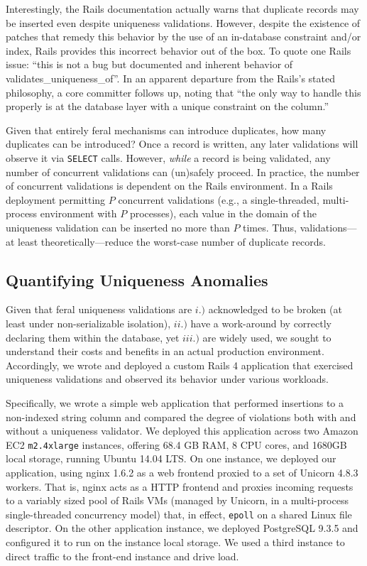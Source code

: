 Interestingly, the Rails documentation actually warns that duplicate
records may be inserted even despite uniqueness validations. However,
despite the existence of patches that remedy this behavior by the use
of an in-database constraint and/or index, Rails provides this
incorrect behavior out of the box. To quote one Rails issue: ``this is
not a bug but documented and inherent behavior of
validates\_uniqueness\_of''. In an apparent departure from the Rails's
stated philosophy, a core committer follows up, noting that ``the only
way to handle this properly is at the database layer with a unique
constraint on the column.''

Given that entirely feral mechanisms can introduce duplicates, how
many duplicates can be introduced? Once a record is written, any later
validations will observe it via \texttt{SELECT} calls. However,
\textit{while} a record is being validated, any number of concurrent
validations can (un)safely proceed. In practice, the number of
concurrent validations is dependent on the Rails environment. In a
Rails deployment permitting $P$ concurrent validations (e.g., a
single-threaded, multi-process environment with $P$ processes), each
value in the domain of the uniqueness validation can be inserted no
more than $P$ times. Thus, validations---at least
theoretically---reduce the worst-case number of duplicate records.

\subsection{Quantifying Uniqueness Anomalies}

Given that feral uniqueness validations are $i.)$ acknowledged to be
broken (at least under non-serializable isolation), $ii.)$ have a
work-around by correctly declaring them within the database, yet
$iii.)$ are widely used, we sought to understand their costs and
benefits in an actual production environment. Accordingly, we wrote
and deployed a custom Rails 4 application that exercised uniqueness
validations and observed its behavior under various workloads.

Specifically, we wrote a simple web application that performed
insertions to a non-indexed string column and compared the degree of
violations both with and without a uniqueness validator. We deployed
this application across two Amazon EC2 \texttt{m2.4xlarge} instances,
offering 68.4 GB RAM, 8 CPU cores, and 1680GB local storage, running
Ubuntu 14.04 LTS. On one instance, we deployed our application, using
nginx 1.6.2 as a web frontend proxied to a set of Unicorn 4.8.3
workers. That is, nginx acts as a HTTP frontend and proxies incoming
requests to a variably sized pool of Rails VMs (managed by Unicorn, in
a multi-process single-threaded concurrency model) that, in effect,
\texttt{epoll} on a shared Linux file descriptor. On the other
application instance, we deployed PostgreSQL 9.3.5 and configured it
to run on the instance local storage. We used a third instance to
direct traffic to the front-end instance and drive load.

